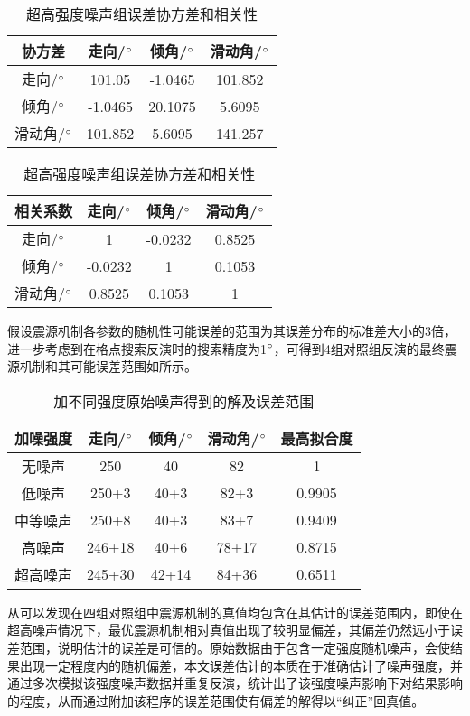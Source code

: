 \begin{table}[ht]
\centering
\caption{超高强度噪声组误差协方差和相关性}
\label{tab3_05}
    \begin{tabular}{c c c c}
    \hline
    协方差 & 走向/$^\circ$ & 倾角/$^\circ$ & 滑动角/$^\circ$ \\
    \hline
	走向/$^\circ$ 		&101.05 	&-1.0465	&101.852\\
	倾角/$^\circ$		&-1.0465	&20.1075	&5.6095\\
	滑动角/$^\circ$	&101.852	&5.6095		&141.257\\
    \hline
    \end{tabular}
    \begin{tabular}{c c c c}
    \hline
    相关系数 & 走向/$^\circ$ & 倾角/$^\circ$ & 滑动角/$^\circ$ \\
    \hline
	走向/$^\circ$ 		&1 			&-0.0232	&0.8525\\
	倾角/$^\circ$		&-0.0232	&1			&0.1053\\
	滑动角/$^\circ$	&0.8525		&0.1053		&1\\
    \hline
    \end{tabular}
\end{table}
假设震源机制各参数的随机性可能误差的范围为其误差分布的标准差大小的3倍，进一步考虑到在格点搜索反演时的搜索精度为1$^\circ$，可得到4组对照组反演的最终震源机制和其可能误差范围如所示。
\begin{table}[ht]
\centering
\caption{加不同强度原始噪声得到的解及误差范围}
\label{tab3_06}
    \begin{tabular}{c c c c c}
    \hline
    加噪强度 & 走向/$^\circ$ & 倾角/$^\circ$ & 滑动角/$^\circ$ &最高拟合度 \\
    \hline
    无噪声		& 250 & 40 & 82  & 1\\
    低噪声		& 250+3 & 40+3 & 82+3 & 0.9905 \\
    中等噪声	& 250+8 & 40+3 & 83+7 & 0.9409 \\
    高噪声		& 246+18 & 40+6 & 78+17 & 0.8715 \\
    超高噪声	& 245+30 & 42+14 & 84+36 & 0.6511 \\
    \hline
    \end{tabular}
\end{table}

从可以发现在四组对照组中震源机制的真值均包含在其估计的误差范围内，即使在超高噪声情况下，最优震源机制相对真值出现了较明显偏差，其偏差仍然远小于误差范围，说明估计的误差是可信的。原始数据由于包含一定强度随机噪声，会使结果出现一定程度内的随机偏差，本文误差估计的本质在于准确估计了噪声强度，并通过多次模拟该强度噪声数据并重复反演，统计出了该强度噪声影响下对结果影响的程度，从而通过附加该程序的误差范围使有偏差的解得以“纠正”回真值。

